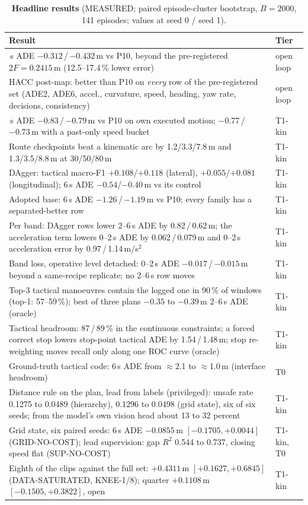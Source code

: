 \documentclass[10pt,twocolumn]{article}
\theoremstyle{remark}
\begin{document}
\begin{table}[!t]
\centering
\caption{\textbf{Headline results} (MEASURED; paired episode-cluster bootstrap, $B=2000$, 141 episodes; values at seed 0 / seed 1).}
\label{tab:headline}
\small
\begin{tabularx}{\columnwidth}{@{}>{\raggedright\arraybackslash}Xl@{}}
\toprule
Result & Tier \\
\midrule
6\,s ADE $-0.312$\,/\,$-0.432$\,m vs P10, beyond the pre-registered $2F=0.2415$\,m (12.5--17.4\,\% lower error) & open loop \\
HACC post-map: better than P10 on \emph{every} row of the pre-registered set (ADE2, ADE6, accel., curvature, speed, heading, yaw rate, decisions, consistency) & open loop \\
6\,s ADE $-0.83$\,/\,$-0.79$\,m vs P10 on own executed motion; $-0.77$\,/\,$-0.73$\,m with a past-only speed bucket & T1-kin \\
Route checkpoints beat a kinematic arc by 1.2/3.3/7.8\,m and 1.3/3.5/8.8\,m at 30/50/80\,m & T1-kin \\
DAgger: tactical macro-F1 $+0.108$/$+0.118$ (lateral), $+0.055$/$+0.081$ (longitudinal); 6\,s ADE $-0.54$/$-0.40$\,m vs its control & T1-kin \\
Adopted base: 6\,s ADE $-1.26$\,/\,$-1.19$\,m vs P10; every family has a separated-better row & T1-kin \\
Per band: DAgger rows lower 2--6\,s ADE by 0.82\,/\,0.62\,m; the acceleration term lowers 0--2\,s ADE by 0.062\,/\,0.079\,m and 0--2\,s acceleration error by 0.97\,/\,1.14\,m/s$^2$ & T1-kin \\
Band loss, operative level detached: 0--2\,s ADE $-0.017$\,/\,$-0.015$\,m beyond a same-recipe replicate; no 2--6\,s row moves & T1-kin \\
Top-3 tactical manoeuvres contain the logged one in 90\,\% of windows (top-1: 57--59\,\%); best of three plans $-0.35$ to $-0.39$\,m 2--6\,s ADE (oracle) & T1-kin \\
Tactical headroom: 87\,/\,89\,\% in the continuous constraints; a forced correct stop lowers stop-point tactical ADE by 1.54\,/\,1.48\,m; stop re-weighting moves recall only along one ROC curve (oracle) & T1-kin \\
Ground-truth tactical code: 6\,s ADE from $\approx$2.1 to $\approx$1.0\,m (interface headroom) & T0 \\
Distance rule on the plan, lead from labels (privileged): unsafe rate 0.1275 to 0.0489 (hierarchy), 0.1296 to 0.0498 (grid state), six of six seeds; from the model's own vision head about 13 to 32 percent & T1-kin \\
Grid state, six paired seeds: 6\,s ADE $-0.0855$\,m $[-0.1705,+0.0044]$ (GRID-NO-COST); lead supervision: gap $R^2$ 0.544 to 0.737, closing speed flat (SUP-NO-COST) & T1-kin, T0 \\
Eighth of the clips against the full set: $+0.4311$\,m $[+0.1627,+0.6845]$ (DATA-SATURATED, KNEE-1/8); quarter $+0.1108$\,m $[-0.1505,+0.3822]$, open & T1-kin \\
\bottomrule
\end{tabularx}
\end{table}
\end{document}
